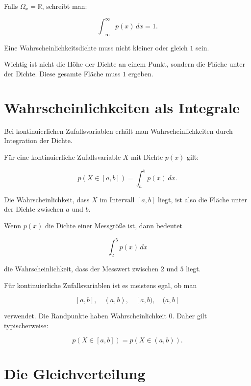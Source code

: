 Falls \(\Omega_x = \mathbb{R}\), schreibt man:

\[
    \int_{-\infty}^{\infty} p(x)\,dx = 1.
\]

\begin{conceptbox}
Eine Wahrscheinlichkeitsdichte muss nicht kleiner oder gleich \(1\) sein.

Wichtig ist nicht die Höhe der Dichte an einem Punkt, sondern die Fläche unter der Dichte.
Diese gesamte Fläche muss \(1\) ergeben.
\end{conceptbox}

\section{Wahrscheinlichkeiten als Integrale}

Bei kontinuierlichen Zufallsvariablen erhält man Wahrscheinlichkeiten durch Integration der Dichte.

\begin{definitionbox}
Für eine kontinuierliche Zufallsvariable \(X\) mit Dichte \(p(x)\) gilt:

\[
    p(X \in [a,b])
    =
    \int_a^b p(x)\,dx.
\]

Die Wahrscheinlichkeit, dass \(X\) im Intervall \([a,b]\) liegt, ist also die Fläche unter der Dichte zwischen \(a\) und \(b\).
\end{definitionbox}

\begin{examplebox}
Wenn \(p(x)\) die Dichte einer Messgröße ist, dann bedeutet

\[
    \int_2^5 p(x)\,dx
\]

die Wahrscheinlichkeit, dass der Messwert zwischen \(2\) und \(5\) liegt.
\end{examplebox}

\begin{notebox}
Für kontinuierliche Zufallsvariablen ist es meistens egal, ob man

\[
    [a,b],
    \quad
    (a,b),
    \quad
    [a,b),
    \quad
    (a,b]
\]

verwendet.
Die Randpunkte haben Wahrscheinlichkeit \(0\).
Daher gilt typischerweise:

\[
    p(X \in [a,b])
    =
    p(X \in (a,b)).
\]
\end{notebox}

\section{Die Gleichverteilung}

